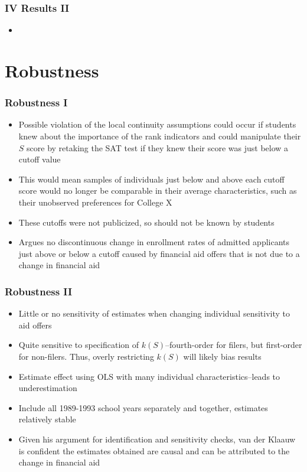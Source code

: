 \documentclass{beamer}
\begin{document}
\begin{frame}
\frametitle{IV Results II}
\begin{itemize}
	\item 
\end{itemize}
\end{frame}


\section{Robustness}


\begin{frame}
\frametitle{Robustness I}
\begin{itemize}
	\item Possible violation of the local continuity assumptions could occur if students knew about the importance of the rank indicators and could manipulate their $S$ score by retaking the SAT test if they knew their score was just below a cutoff value
	\item This would mean samples of individuals just below and above each cutoff score would no longer be comparable in their average characteristics, such as their unobserved preferences for College X
	\item These cutoffs were not publicized, so should not be known by students
	\item Argues no discontinuous change in enrollment rates of admitted applicants just above or below a cutoff caused by financial aid offers that is not due to a change in financial aid
\end{itemize}
\end{frame}

\begin{frame}
\frametitle{Robustness II}
\begin{itemize}
	\item Little or no sensitivity of estimates when changing individual sensitivity to aid offers
	\item Quite sensitive to specification of $k(S)$--fourth-order for filers, but first-order for non-filers. Thus, overly restricting $k(S)$ will likely bias results
	\item Estimate effect using OLS with many individual characteristics--leads to underestimation
	\item Include all 1989-1993 school years separately and together, estimates relatively stable
	\item Given his argument for identification and sensitivity checks, van der Klaauw is confident the estimates obtained are causal and can be attributed to the change in financial aid
\end{itemize}
\end{frame}
\end{document}
